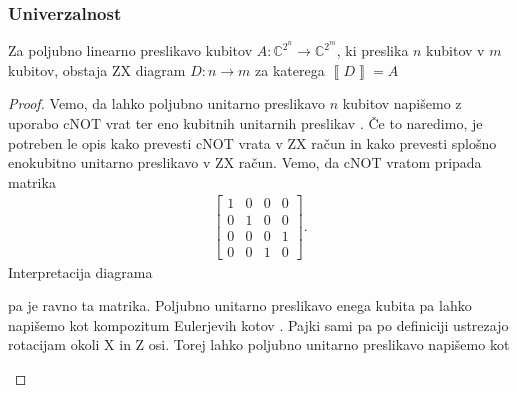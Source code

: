 \documentclass[mat1]{fmfdelo}
\newcommand{\C}{\mathbb C}
\newcommand{\interpret}[1]{\left\llbracket #1 \right\rrbracket}
\begin{document}
\subsubsection{Univerzalnost}
\begin{izrek}[Univerzalnost]
    Za poljubno linearno preslikavo kubitov \(A:\C^{2^n}\to \C^{2^m}\), ki preslika \(n\) kubitov v \(m\) kubitov, obstaja ZX diagram \(D:n\to m\) za katerega \(\interpret{D}=A\)
\end{izrek}
\begin{proof}
Vemo, da lahko poljubno unitarno preslikavo \(n\) kubitov napišemo z uporabo cNOT vrat ter eno kubitnih unitarnih preslikav \cite[Izrek 5.26]{mathforqm}. Če to naredimo, je potreben le opis kako prevesti cNOT vrata v ZX račun in kako prevesti splošno enokubitno unitarno preslikavo v ZX račun. Vemo, da cNOT vratom pripada matrika
\begin{align*}
    \begin{bmatrix}
        1&0&0&0\\
        0&1&0&0\\
        0&0&0&1\\
        0&0&1&0
    \end{bmatrix}.
\end{align*}
Interpretacija diagrama
\begin{center}
\end{center}
pa je ravno ta matrika. Poljubno unitarno preslikavo enega kubita pa lahko napišemo kot kompozitum Eulerjevih kotov \cite[Izrek 5.11]{mathforqm}. Pajki sami pa po definiciji ustrezajo rotacijam okoli X in Z osi. Torej lahko poljubno unitarno preslikavo napišemo kot
\begin{center}
\end{center}
\end{proof}
\end{document}

